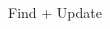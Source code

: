 \documentclass[t]{beamer}
\theoremstyle{plain}
\begin{document}
\begin{frame}{Find + Update}
\begin{columns}
\begin{column}{.35\textwidth}
{            
}
\end{column}
\end{columns}
\end{frame}
\end{document}

